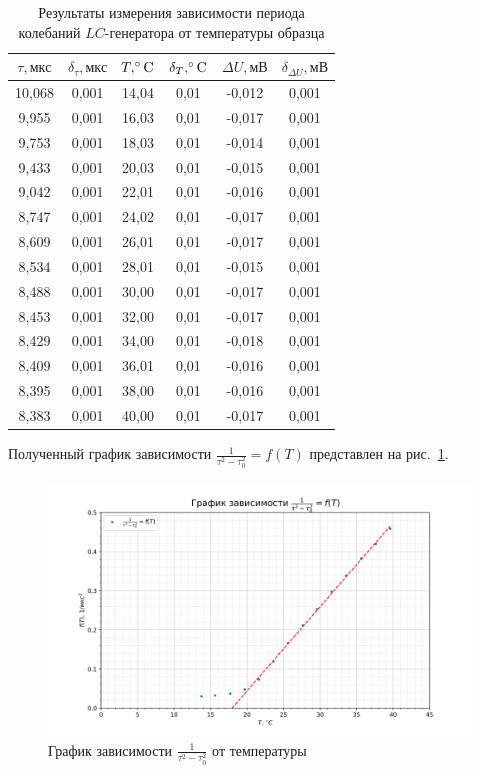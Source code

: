 \documentclass[a4paper, 12pt]{article}
\begin{document}
\begin{table}[h!]
\begin{center}
\begin{tabular}{|c|c|c|c|c|c|}
\hline
$\tau, мкс$ & $\delta_{\tau}, мкс$ & $T, \celsius$ & $\delta_T, \celsius$ & $\Delta{U}, мВ$ & $\delta_{\Delta{U}}, мВ$ \\ \hline
10,068 & 0,001 & 14,04 & 0,01 & -0,012 & 0,001 \\ \hline
9,955 & 0,001 & 16,03 & 0,01 & -0,017 & 0,001 \\ \hline
9,753 & 0,001 & 18,03 & 0,01 & -0,014 & 0,001 \\ \hline
9,433 & 0,001 & 20,03 & 0,01 & -0,015 & 0,001 \\ \hline
9,042 & 0,001 & 22,01 & 0,01 & -0,016 & 0,001 \\ \hline
8,747 & 0,001 & 24,02 & 0,01 & -0,017 & 0,001 \\ \hline
8,609 & 0,001 & 26,01 & 0,01 & -0,017 & 0,001 \\ \hline
8,534 & 0,001 & 28,01 & 0,01 & -0,015 & 0,001 \\ \hline
8,488 & 0,001 & 30,00 & 0,01 & -0,017 & 0,001 \\ \hline
8,453 & 0,001 & 32,00 & 0,01 & -0,017 & 0,001 \\ \hline
8,429 & 0,001 & 34,00 & 0,01 & -0,018 & 0,001 \\ \hline
8,409 & 0,001 & 36,01 & 0,01 & -0,016 & 0,001 \\ \hline
8,395 & 0,001 & 38,00 & 0,01 & -0,016 & 0,001 \\ \hline
8,383 & 0,001 & 40,00 & 0,01 & -0,017 & 0,001 \\ \hline
\end{tabular}
\end{center}
\caption{Результаты измерения зависимости периода колебаний $LC$-генератора от температуры образца}
\label{tab1}
\end{table}

Полученный график зависимости $\frac{1}{\tau^2-\tau_0^2} = f(T)$ представлен на рис.~\ref{ris2}.

\begin{figure}[h!]
\begin{center}
    \includegraphics[scale=0.7]{3.4.2_1.png}
\end{center}
\caption{График зависимости $\frac{1}{\tau^2-\tau_0^2}$ от температуры}
\label{ris2}
\end{figure}
\end{document}
